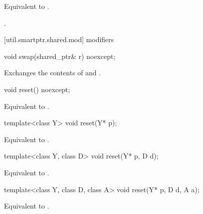 \begin{itemdescr}
\pnum
\effects Equivalent to .

\pnum
\returns {}.
\end{itemdescr}



[util.smartptr.shared.mod]{ modifiers}

%
\begin{itemdecl}
void swap(shared_ptr& r) noexcept;
\end{itemdecl}

\begin{itemdescr}

\pnum\effects  Exchanges the contents of  and .
\end{itemdescr}

%
\begin{itemdecl}
void reset() noexcept;
\end{itemdecl}

\begin{itemdescr}
\pnum\effects  Equivalent to .
\end{itemdescr}

%
\begin{itemdecl}
template<class Y> void reset(Y* p);
\end{itemdecl}

\begin{itemdescr}
\pnum\effects  Equivalent to .
\end{itemdescr}

%
\begin{itemdecl}
template<class Y, class D> void reset(Y* p, D d);
\end{itemdecl}

\begin{itemdescr}
\pnum\effects  Equivalent to .
\end{itemdescr}

%
\begin{itemdecl}
template<class Y, class D, class A> void reset(Y* p, D d, A a);
\end{itemdecl}

\begin{itemdescr}
\pnum
\effects  Equivalent to .
\end{itemdescr}

